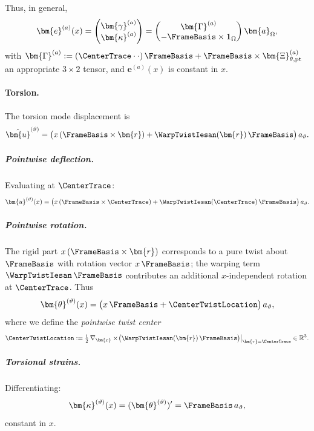 Thus, in general,
\begin{equation}
\bm{e}^{(a)}(x)
=
\begin{pmatrix}
\bm{\gamma}^{(a)} \\
\bm{\kappa}^{(a)}
\end{pmatrix}
=
\begin{pmatrix}
\bm{\Gamma}^{(a)} \\
-\FrameBasis \times \mathbf{1}_\Omega
\end{pmatrix}\bm{a}_\Omega,
\end{equation}
with 
$\bm{\Gamma}^{(a)} := 
(\CenterTrace\cdot \cdot)\,\FrameBasis 
+ \FrameBasis \times \bm{\Xi}^{(a)}_{\theta,\mathrm{pt}}$ an appropriate 
$3\times 2$ tensor, and $\bm{e}^{(a)}(x)$ is constant in $x$.

\paragraph{Torsion.}

The torsion mode displacement is
\begin{equation*}
\hat{\bm{u}}^{(\vartheta)} = \big( x\,(\FrameBasis \times \bm{r}) 
+ \WarpTwistIesan(\bm{r})\,\FrameBasis \big)\,a_\vartheta.
\end{equation*}

\subparagraph{Pointwise deflection.}
Evaluating at $\CenterTrace$:
\begin{equation*}
\bm{u}^{(\vartheta)}(x)
=
\big( x\,(\FrameBasis \times \CenterTrace) 
+ \WarpTwistIesan(\CenterTrace)\,\FrameBasis \big)\,a_\vartheta.
\end{equation*}

\subparagraph{Pointwise rotation.}
The rigid part $x\,(\FrameBasis \times \bm{r})$ corresponds to a pure twist 
about $\FrameBasis$ with rotation vector $x\,\FrameBasis$; the warping term 
$\WarpTwistIesan\,\FrameBasis$ contributes an additional $x$-independent 
rotation at $\CenterTrace$. Thus
\begin{equation}
\bm{\theta}^{(\vartheta)}(x)
=
\big(x\,\FrameBasis + \CenterTwistLocation\big)\,a_\vartheta,
\label{eq:theta-torsion-pt}
\end{equation}
where we define the \emph{pointwise twist center}
\begin{equation}
\CenterTwistLocation
:=
\tfrac{1}{2}\,\nabla_{\bm{x}}\times\!\big(\WarpTwistIesan(\bm{r})\,\FrameBasis\big)
\big|_{\bm{r}=\CenterTrace}
\in \mathbb{R}^3.
\end{equation}

\subparagraph{Torsional strains.}
Differentiating:
\begin{equation*}
\bm{\kappa}^{(\vartheta)}(x)
=
(\bm{\theta}^{(\vartheta)})' = \FrameBasis\,a_\vartheta,
\end{equation*}
constant in $x$.

